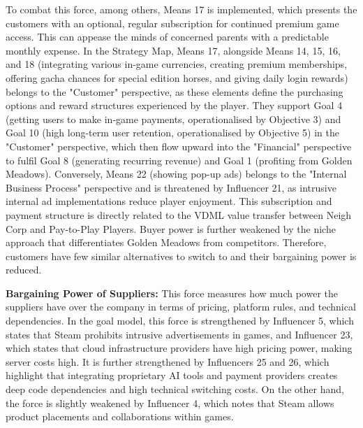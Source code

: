 \documentclass{article}
\begin{document}
To combat this force, among others, Means 17 is implemented, which presents the customers with an optional, regular subscription for continued premium game access. This can appease the minds of concerned parents with a predictable monthly expense. In the Strategy Map, Means 17, alongside Means 14, 15, 16, and 18 (integrating various in-game currencies, creating premium memberships, offering gacha chances for special edition horses, and giving daily login rewards) belongs to the "Customer" perspective, as these elements define the purchasing options and reward structures experienced by the player. They support Goal 4 (getting users to make in-game payments, operationalised by Objective 3) and Goal 10 (high long-term user retention, operationalised by Objective 5) in the "Customer" perspective, which then flow upward into the "Financial" perspective to fulfil Goal 8 (generating recurring revenue) and Goal 1 (profiting from Golden Meadows). Conversely, Means 22 (showing pop-up ads) belongs to the "Internal Business Process" perspective and is threatened by Influencer 21, as intrusive internal ad implementations reduce player enjoyment. This subscription and payment structure is directly related to the VDML value transfer between Neigh Corp and Pay-to-Play Players. Buyer power is further weakened by the niche approach that differentiates Golden Meadows from competitors. Therefore, customers have few similar alternatives to switch to and their bargaining power is reduced.

\textbf{Bargaining Power of Suppliers:}
This force measures how much power the suppliers have over the company in terms of pricing, platform rules, and technical dependencies. In the goal model, this force is strengthened by Influencer 5, which states that Steam prohibits intrusive advertisements in games, and Influencer 23, which states that cloud infrastructure providers have high pricing power, making server costs high. It is further strengthened by Influencers 25 and 26, which highlight that integrating proprietary AI tools and payment providers creates deep code dependencies and high technical switching costs. On the other hand, the force is slightly weakened by Influencer 4, which notes that Steam allows product placements and collaborations within games.
\end{document}
